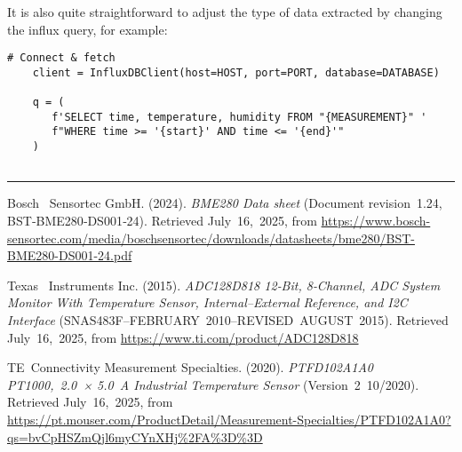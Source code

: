 \documentclass[onecolumn]{article}
\begin{document}
It is also quite straightforward to adjust the type of data extracted by changing the influx query, for example:

\begin{lstlisting}[numbers=none]
    # Connect & fetch
    client = InfluxDBClient(host=HOST, port=PORT, database=DATABASE)
    
    q = (
       f'SELECT time, temperature, humidity FROM "{MEASUREMENT}" '
       f"WHERE time >= '{start}' AND time <= '{end}'"
    )
    
\end{lstlisting}




\balance  %

\vspace{1ex}
\noindent\hspace*{\fill}\rule{0.33\textwidth}{0.6pt}\hspace*{\fill}
\vspace{1ex}



\small
\begin{thebibliography}{10}


Bosch \ Sensortec GmbH. (2024). \emph{BME280 Data sheet} (Document revision\ 1.24, BST‑BME280‑DS001‑24). Retrieved July\ 16,\ 2025, from \url{https://www.bosch-sensortec.com/media/boschsensortec/downloads/datasheets/bme280/BST-BME280-DS001-24.pdf}

Texas \ Instruments Inc. (2015). \emph{ADC128D818 12‑Bit, 8‑Channel, ADC System Monitor With Temperature Sensor, Internal–External Reference, and I2C Interface} (SNAS483F–FEBRUARY\ 2010–REVISED\ AUGUST\ 2015). Retrieved July\ 16,\ 2025, from \url{https://www.ti.com/product/ADC128D818}

TE\ Connectivity Measurement Specialties. (2020). \emph{PTFD102A1A0 PT1000,\ 2.0\ × 5.0\ A Industrial Temperature Sensor} (Version\ 2\ 10/2020). Retrieved July\ 16,\ 2025, from \url{https://pt.mouser.com/ProductDetail/Measurement-Specialties/PTFD102A1A0?qs=bvCpHSZmQjl6myCYnXHj%2FA%3D%3D}



\end{thebibliography}

\newpage
\appendix

\vspace{-2em}
\end{document}
